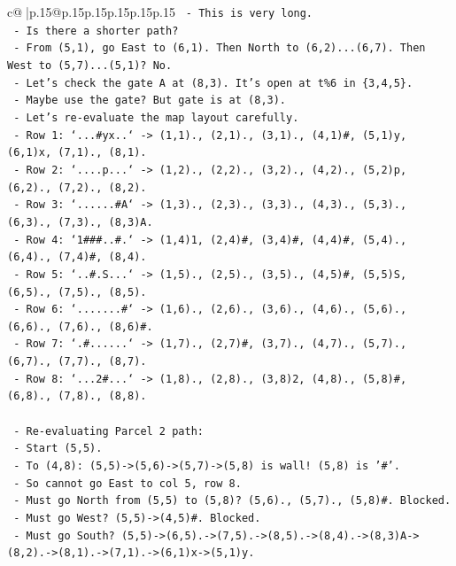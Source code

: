 \documentclass{article}
\begin{document}
{\begin{supertabular}{c@{$\;$}|p{.15\linewidth}@{}p{.15\linewidth}p{.15\linewidth}p{.15\linewidth}p{.15\linewidth}p{.15\linewidth}}
{{{\texttt{        {-} This is very long.} \\
\texttt{        {-} Is there a shorter path?} \\
\texttt{        {-} From (5,1), go East to (6,1). Then North to (6,2)...(6,7). Then West to (5,7)...(5,1)? No.} \\
\texttt{        {-} Let's check the gate A at (8,3). It's open at t\%6 in \{3,4,5\}.} \\
\texttt{        {-} Maybe use the gate? But gate is at (8,3).} \\
\texttt{        {-} Let's re{-}evaluate the map layout carefully.} \\
\texttt{        {-} Row 1: `...\#yx..` {-}> (1,1)., (2,1)., (3,1)., (4,1)\#, (5,1)y, (6,1)x, (7,1)., (8,1).} \\
\texttt{        {-} Row 2: `....p...` {-}> (1,2)., (2,2)., (3,2)., (4,2)., (5,2)p, (6,2)., (7,2)., (8,2).} \\
\texttt{        {-} Row 3: `......\#A` {-}> (1,3)., (2,3)., (3,3)., (4,3)., (5,3)., (6,3)., (7,3)., (8,3)A.} \\
\texttt{        {-} Row 4: `1\#\#\#..\#.` {-}> (1,4)1, (2,4)\#, (3,4)\#, (4,4)\#, (5,4)., (6,4)., (7,4)\#, (8,4).} \\
\texttt{        {-} Row 5: `..\#.S...` {-}> (1,5)., (2,5)., (3,5)., (4,5)\#, (5,5)S, (6,5)., (7,5)., (8,5).} \\
\texttt{        {-} Row 6: `.......\#` {-}> (1,6)., (2,6)., (3,6)., (4,6)., (5,6)., (6,6)., (7,6)., (8,6)\#.} \\
\texttt{        {-} Row 7: `.\#......` {-}> (1,7)., (2,7)\#, (3,7)., (4,7)., (5,7)., (6,7)., (7,7)., (8,7).} \\
\texttt{        {-} Row 8: `...2\#...` {-}> (1,8)., (2,8)., (3,8)2, (4,8)., (5,8)\#, (6,8)., (7,8)., (8,8).} \\
\\ 
\texttt{    {-} Re{-}evaluating Parcel 2 path:} \\
\texttt{      {-} Start (5,5).} \\
\texttt{      {-} To (4,8): (5,5){-}>(5,6){-}>(5,7){-}>(5,8) is wall! (5,8) is '\#'.} \\
\texttt{      {-} So cannot go East to col 5, row 8.} \\
\texttt{      {-} Must go North from (5,5) to (5,8)? (5,6)., (5,7)., (5,8)\#. Blocked.} \\
\texttt{      {-} Must go West? (5,5){-}>(4,5)\#. Blocked.} \\
\texttt{      {-} Must go South? (5,5){-}>(6,5).{-}>(7,5).{-}>(8,5).{-}>(8,4).{-}>(8,3)A{-}>(8,2).{-}>(8,1).{-}>(7,1).{-}>(6,1)x{-}>(5,1)y.} \\
}}}
\end{supertabular}}
\end{document}
